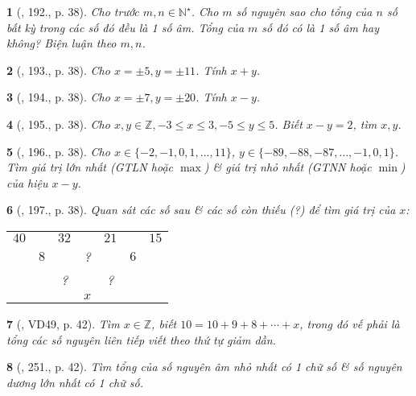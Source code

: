 \documentclass{article}
\newtheorem{baitoan}{}
\begin{document}
\begin{baitoan}[\cite{Tuyen_Toan_6}, 192., p. 38]
	Cho trước $m,n\in\mathbb{N}^\star$. Cho $m$ số nguyên sao cho tổng của $n$ số bất kỳ trong các số đó đều là 1 số âm. Tổng của $m$ số đó có là 1 số âm hay không? Biện luận theo $m,n$.
\end{baitoan}

\begin{baitoan}[\cite{Tuyen_Toan_6}, 193., p. 38]
	Cho $x = \pm5,y = \pm11$. Tính $x + y$.
\end{baitoan}

\begin{baitoan}[\cite{Tuyen_Toan_6}, 194., p. 38]
	Cho $x = \pm7,y = \pm20$. Tính $x - y$.
\end{baitoan}

\begin{baitoan}[\cite{Tuyen_Toan_6}, 195., p. 38]
	Cho $x,y\in\mathbb{Z},-3\le x\le3,-5\le y\le5$. Biết $x - y = 2$, tìm $x,y$.
\end{baitoan}

\begin{baitoan}[\cite{Tuyen_Toan_6}, 196., p. 38]
	Cho $x\in\{-2,-1,0,1,\ldots,11\}$, $y\in\{-89,-88,-87,\ldots,-1,0,1\}$. Tìm giá trị lớn nhất (GTLN hoặc $\max$) \& giá trị nhỏ nhất (GTNN hoặc $\min$) của hiệu $x - y$.
\end{baitoan}

\begin{baitoan}[\cite{Tuyen_Toan_6}, 197., p. 38]
	Quan sát các số sau \& các số còn thiếu (?) để tìm giá trị của $x$:
	\begin{table}[H]
		\centering
		\begin{tabular}{ccccccc}
			$40$ &  & $32$ &  & $21$ &  &  $15$ \\
			& $8$ &  & ? &  & $6$ &  \\
			&  & ? &  & ? &  &  \\
			&  &  & $x$ &  &  &  \\
		\end{tabular}
	\end{table}
\end{baitoan}

\begin{baitoan}[\cite{Binh_Toan_6_tap_1}, VD49, p. 42]
	Tìm $x\in\mathbb{Z}$, biết $10 = 10 + 9 + 8 + \cdots + x$, trong đó vế phải là tổng các số nguyên liên tiếp viết theo thứ tự giảm dần.
\end{baitoan}

\begin{baitoan}[\cite{Binh_Toan_6_tap_1}, 251., p. 42]
	Tìm tổng của số nguyên âm nhỏ nhất có 1 chữ số \& số nguyên dương lớn nhất có 1 chữ số.
\end{baitoan}
\end{document}
